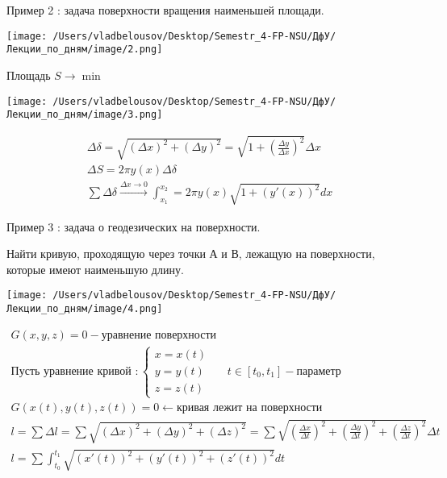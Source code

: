 \documentclass[12pt, a4paper]{report}
\begin{document}
\begin{flushleft}
    Пример 2 : задача поверхности вращения наименьшей площади. 
\end{flushleft}

\begin{center}
    \texttt{[image: /Users/vladbelousov/Desktop/Semestr\_4-FP-NSU/ДфУ/Лекции\_по\_дням/image/2.png]}
\end{center}

Площадь \( S \to \min  \) 

\begin{center}
    \texttt{[image: /Users/vladbelousov/Desktop/Semestr\_4-FP-NSU/ДфУ/Лекции\_по\_дням/image/3.png]}
\end{center}

\begin{gather*}
    \Delta \delta= \sqrt{(\Delta x ) ^2 + ( \Delta y) ^2} = \sqrt{1 + \left( \frac{\Delta y}{\Delta x}  \right) ^2} \Delta x \\
    \Delta S = 2 \pi y (x) \Delta \delta \\
    \sum  \Delta \delta \xrightarrow{\Delta x \to  0}  \int_{x_1}^{x_2}= 2 \pi y(x ) \sqrt{1+(y'(x))^2}dx  
\end{gather*}


\begin{flushleft}
    Пример 3 : задача о геодезических на поверхности.
\end{flushleft}

Найти кривую, проходящую через точки А и В, лежащую на поверхности, которые имеют наименьшую длину.

\begin{center}
    \texttt{[image: /Users/vladbelousov/Desktop/Semestr\_4-FP-NSU/ДфУ/Лекции\_по\_дням/image/4.png]}
\end{center}
\begin{gather*}
    G(x,y,z)=0 - \text{уравнение поверхности} \\ 
    \text{Пусть уравнение кривой }:
    \begin{cases}
        x=x(t) \\
        y=y(t) \quad \quad t \in  [t_0,t_1] - \text{параметр} \\
        z= z(t)
    \end{cases}\\
    G(x(t),y(t),z(t)) = 0 \leftarrow \text{кривая лежит на поверхности}  \\
    l= \sum  \Delta l = \sum \sqrt{(\Delta x) ^2 + ( \Delta y ) ^2 + ( \Delta z ) ^2}=\sum  \sqrt{\left( \frac{\Delta x}{\Delta t} \right) ^2 + \left( \frac{\Delta y}{\Delta t} \right) ^2 + \left( \frac{\Delta z}{\Delta t} \right) ^2} \Delta t \\
    l= \sum  \int_{t_0}^{t_1} \sqrt{(x'(t)) ^2 + ( y'(t)) ^2 + ( z' ( t)) ^2 }dt  
\end{gather*}
\end{document}
